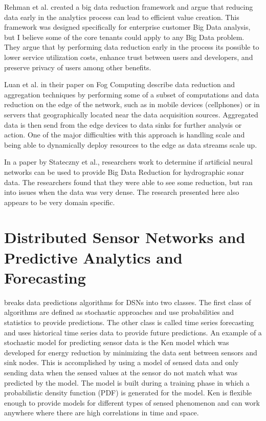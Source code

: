 Rehman et al. created a big data reduction framework\cite{ur2016big} and argue that reducing data early in the analytics process can lead to efficient value creation. This framework was designed specifically for enterprise customer Big Data analysis, but I believe some of the core tenants could apply to any Big Data problem. They argue that by performing data reduction early in the process its possible to lower service utilization costs, enhance trust between users and developers, and preserve privacy of users among other benefits. 

Luan et al. in their paper on Fog Computing\cite{luan2015fog} describe data reduction and aggregation techniques by performing some of a subset of computations and data reduction on the edge of the network, such as in mobile devices (cellphones) or in servers that geographically located near the data acquisition sources. Aggregated data is then send from the edge devices to data sinks for further analysis or action. One of the major difficulties with this approach is handling scale and being able to dynamically deploy resources to the edge as data streams scale up.

In a paper by Stateczny et al.\cite{stateczny2014self}, researchers work to determine if artificial neural networks can be used to provide Big Data Reduction for hydrographic sonar data. The researchers found that they were able to see some reduction, but ran into issues when the data was very dense. The research presented here also appears to be very domain specific.

\section{Distributed Sensor Networks and Predictive Analytics and Forecasting}
\cite{anastasi_energy_2009} breaks data predictions algorithms for DSNs into two classes. The first class of algorithms are defined as stochastic approaches and use probabilities and statistics to provide predictions. The other class is called time series forecasting and uses historical time series data to provide future predictions. An example of a stochastic model for predicting sensor data is the Ken model\cite{chu2006approximate} which was developed for energy reduction by minimizing the data sent between sensors and sink nodes. This is accomplished by using a model of sensed data and only sending data when the sensed values at the sensor do not match what was predicted by the model. The model is built during a training phase in which a probabilistic density function (PDF) is generated for the model. Ken is flexible enough to provide models for different types of sensed phenomenon and can work anywhere where there are high correlations in time and space.


